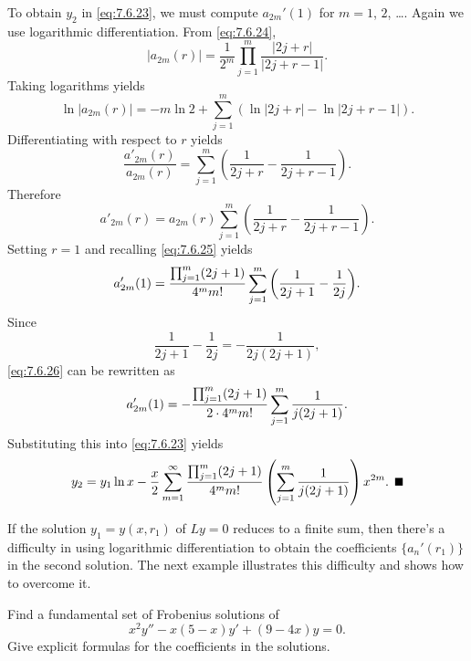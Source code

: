 \begin{examplesolution}
To obtain $y_{2}$ in \eqref{eq:7.6.23}, we must compute $a_{2m}'(1)$ for $m=1$, $2$, \dots. Again we
use logarithmic differentiation. From \eqref{eq:7.6.24},
\[
  |a_{2m}(r)|=\frac{1}{2^{m}}\prod_{j=1}^{m}\frac{|2j+r|}{|2j+r-1|}.
\]
Taking logarithms yields
\[
  \ln|a_{2m}(r)|=-m\ln2+\sum^{m}_{j=1}\left(\ln |2j+r|-\ln|2j+r-1|\right).
\]
Differentiating with respect to $r$ yields
\[
  \frac{a'_{2m}(r)}{a_{2m}(r)}=\sum^{m}_{j=1}\left(\frac{1}{2j+r}-\frac{1}{2j+r-1}\right).
\]
Therefore
\[
  a'_{2m}(r)=a_{2m}(r)\sum^{m}_{j=1}\left(\frac{1}{2j+r}-\frac{1}{2j+r-1}\right).
\]
Setting $r=1$ and recalling \eqref{eq:7.6.25} yields
\begin{equation}
  \label{eq:7.6.26}a'_{2m}(1)=\displaystyle{\frac{\prod_{j=1}^{m}(2j+1)}{4^{m}m!} \sum_{j=1}^{m}\left(\frac{1}{2j+1}-\frac{1}{2j}\right)}.
\end{equation}
Since
\[
  \frac{1}{2j+1}-\frac{1}{2j}=-\frac{1}{2j(2j+1)},
\]
\eqref{eq:7.6.26} can be rewritten as
\[
  a_{2m}'(1)=-\displaystyle{\frac{\prod_{j=1}^{m}(2j+1)}{2\cdot4^{m}m!} \sum_{j=1}^{m}\frac{1}{j(2j+1)}}.
\]
Substituting this into \eqref{eq:7.6.23} yields
\[
  y_{2}=y_{1}\ln x-\frac{x}{2}\sum_{m=1}^{\infty}\frac{\prod_{j=1}^{m}(2j+1)}{4^{m}m!}\left(\sum_{j=1}^{m}\frac{1}{j(2j+1)}\right)x^{2m}.\bbox
\]
\end{examplesolution}

If the solution $y_{1}=y(x,r_{1})$ of $Ly=0$ reduces to a finite sum, then there's a difficulty in
using logarithmic differentiation to obtain the coefficients $\{a_{n}'(r_{1})\}$ in the second
solution. The next example illustrates this difficulty and shows how to overcome it.

\begin{example}
  \label{example:7.6.4} \rm Find a fundamental set of Frobenius solutions of
  \begin{equation}
    \label{eq:7.6.27}x^{2}y''-x(5-x)y'+(9-4x)y=0.
  \end{equation}
  Give explicit formulas for the coefficients in the solutions.
\end{example}

